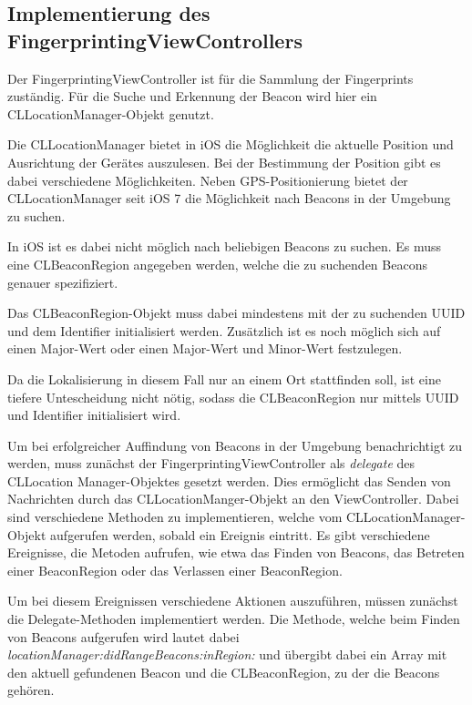 \subsection{Implementierung des FingerprintingViewControllers}
\label{sec:}

Der FingerprintingViewController ist für die Sammlung der Fingerprints zuständig. 
Für die Suche und Erkennung der Beacon wird hier ein CLLocationManager-Objekt genutzt.

Die CLLocationManager bietet in iOS die Möglichkeit die aktuelle Position und Ausrichtung der Gerätes auszulesen. 
Bei der Bestimmung der Position gibt es dabei verschiedene Möglichkeiten. Neben GPS-Positionierung bietet der CLLocationManager seit iOS 7 die Möglichkeit nach Beacons in der Umgebung zu suchen.

In iOS ist es dabei nicht möglich nach beliebigen Beacons zu suchen. Es muss eine CLBeaconRegion angegeben werden, welche die zu suchenden Beacons genauer spezifiziert. 

Das CLBeaconRegion-Objekt muss dabei mindestens mit der zu suchenden UUID und dem Identifier initialisiert werden. Zusätzlich ist es noch möglich sich auf einen Major-Wert oder einen Major-Wert und Minor-Wert festzulegen. 

Da die Lokalisierung in diesem Fall nur an einem Ort stattfinden soll, ist eine tiefere Untescheidung nicht nötig, sodass die CLBeaconRegion nur mittels UUID und Identifier initialisiert wird. 

Um bei erfolgreicher Auffindung von Beacons in der Umgebung benachrichtigt zu werden, muss zunächst der FingerprintingViewController als \emph{delegate} des CLLocation \newline Manager-Objektes gesetzt werden. 
Dies ermöglicht das Senden von Nachrichten durch das CLLocationManger-Objekt an den ViewController. Dabei sind verschiedene Methoden zu implementieren, welche vom CLLocationManager-Objekt aufgerufen werden, sobald ein Ereignis eintritt. Es gibt verschiedene Ereignisse, die Metoden aufrufen, wie etwa das Finden von Beacons, das Betreten einer BeaconRegion oder das Verlassen einer BeaconRegion. 

Um bei diesem Ereignissen verschiedene Aktionen auszuführen, müssen zunächst die Delegate-Methoden implementiert werden. Die Methode, welche beim Finden von Beacons aufgerufen wird lautet dabei \emph{locationManager:didRangeBeacons:inRegion:} und übergibt dabei ein Array mit den aktuell gefundenen Beacon und die CLBeaconRegion, zu der die Beacons gehören.

